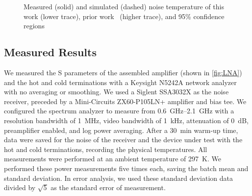 \begin{figure}[ht!]

	\caption{Measured (solid) and simulated (dashed) noise temperature of this work (lower trace), prior work~\cite{shiRoomTemperatureLowNoiseAmplifier2023} (higher trace), and 95\% confidence regions}
	\label{fig:noise_compare}
\end{figure}
\newpage
\subsection{Measured Results}

We measured the S parameters of the assembled amplifier (shown in \autoref{fig:LNA}) and the hot and cold terminations with a Keysight N5242A network analyzer with no averaging or smoothing.
We used a Siglent SSA3032X as the noise receiver, preceded by a Mini-Circuits ZX60-P105LN+ amplifier and bias tee.
We configured the spectrum analyzer to measure from \qtyrange{0.6}{2.1}{\GHz} with a resolution bandwidth of \qty{1}{\MHz}, video bandwidth of \qty{1}{\kHz}, attenuation of \qty{0}{\dB}, preamplifier enabled, and log power averaging.
After a \qty{30}{\minute} warm-up time, data were saved for the noise of the receiver and the device under test with the hot and cold terminations, recording the physical temperatures.
All measurements were performed at an ambient temperature of \qty{297}{\K}.
We performed these power measurements five times each, saving the batch mean and standard deviation.
In error analysis, we used these standard deviation data divided by $\sqrt{5}$ as the standard error of measurement.

